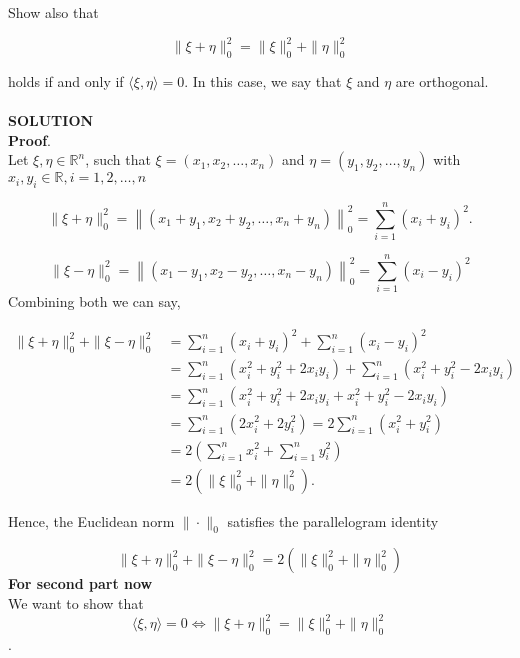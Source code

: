\documentclass{article}
\begin{document}
Show also that

$$
\|\xi+\eta\|_{0}^{2}=\|\xi\|_{0}^{2}+\|\eta\|_{0}^{2}
$$

holds if and only if $\langle\xi, \eta\rangle=0$. In this case, we say that $\xi$ and $\eta$ are orthogonal.\\\\

\textbf{SOLUTION}\\

\textbf{Proof}.\\

Let $\xi, \eta \in \mathbb{R}^{n}$, such that $\xi=\left(x_{1}, x_{2}, \ldots, x_{n}\right)$ and $\eta=\left(y_{1}, y_{2}, \ldots, y_{n}\right)$ with $x_{i},y_i \in \mathbb{R}, i=1,2, \ldots, n$

$$
\|\xi+\eta\|_{0}^{2}=\left\|\left(x_{1}+y_{1}, x_{2}+y_{2}, \ldots, x_{n}+y_{n}\right)\right\|_{0}^{2}=\sum_{i=1}^{n}\left(x_{i}+y_{i}\right)^{2} .
$$

$$
\|\xi-\eta\|_{0}^{2}=\left\|\left(x_{1}-y_{1}, x_{2}-y_{2}, \ldots, x_{n}-y_{n}\right)\right\|_{0}^{2}=\sum_{i=1}^{n}\left(x_{i}-y_{i}\right)^{2}
$$
Combining both we can say,

$$
\begin{aligned}
\|\xi+\eta\|_{0}^{2}+\|\xi-\eta\|_{0}^{2} & =\sum_{i=1}^{n}\left(x_{i}+y_{i}\right)^{2}+\sum_{i=1}^{n}\left(x_{i}-y_{i}\right)^{2} \\
& =\sum_{i=1}^{n}\left(x_{i}^{2}+y_{i}^{2}+2 x_{i} y_{i}\right)+\sum_{i=1}^{n}\left(x_{i}^{2}+y_{i}^{2}-2 x_{i} y_{i}\right) \\
& =\sum_{i=1}^{n}\left(x_{i}^{2}+y_{i}^{2}+2 x_{i} y_{i}+x_{i}^{2}+y_{i}^{2}-2 x_{i} y_{i}\right) \\
& =\sum_{i=1}^{n}\left(2 x_{i}^{2}+2 y_{i}^{2}\right)=2 \sum_{i=1}^{n}\left(x_{i}^{2}+y_{i}^{2}\right) \\
& =2\left(\sum_{i=1}^{n} x_{i}^{2}+\sum_{i=1}^{n} y_{i}^{2}\right) \\
& =2\left(\|\xi\|_{0}^{2}+\|\eta\|_{0}^{2}\right) .
\end{aligned}
$$

Hence, the Euclidean norm $\|\cdot\|_{0}$ satisfies the parallelogram identity

$$
\|\xi+\eta\|_{0}^{2}+\|\xi-\eta\|_{0}^{2}=2\left(\|\xi\|_{0}^{2}+\|\eta\|_{0}^{2}\right)
$$
\newpage
\textbf{For second part now}\\
We want to show that  $$\langle\xi, \eta\rangle=0 \iff \|\xi+\eta\|_{0}^{2}=\|\xi\|_{0}^{2}+\|\eta\|_{0}^{2}$$.
\end{document}
